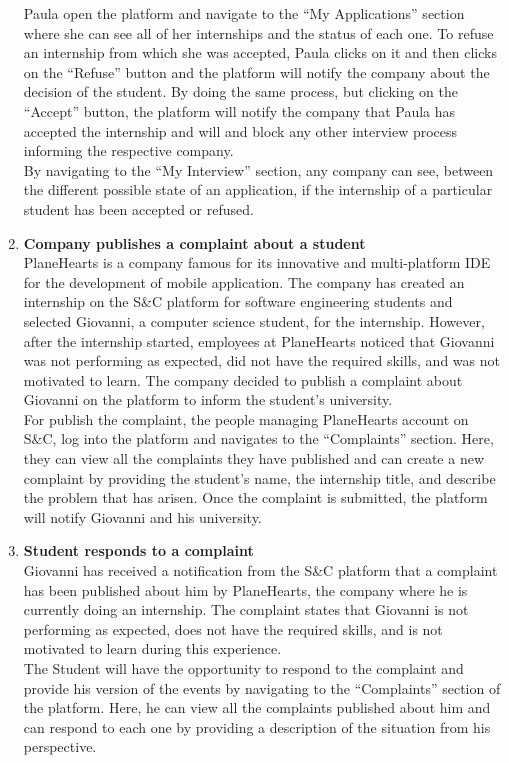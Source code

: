 \begin{enumerate}
    Paula open the platform and navigate to the “My Applications” section where she can see all of her internships and the status of each one. To refuse an internship from which she was accepted, Paula clicks on it and then clicks on the “Refuse” button and the platform will notify the company about the decision of the student. By doing the same process, but clicking on the “Accept” button, the platform will notify the company that Paula has accepted the internship and will and block any other interview process informing the respective company.\\ 
    By navigating to the “My Interview” section, any company can see, between the different possible state of an application, if the internship of a particular student has been accepted or refused.
    \item \textbf{\textcolor{titleColor}{Company publishes a complaint about a student}}\\
        PlaneHearts is a company famous for its innovative and multi-platform IDE for the development of mobile application. The company has created an internship on the S\&C platform for software engineering students and selected Giovanni, a computer science student, for the internship. However, after the internship started, employees at PlaneHearts noticed that Giovanni was not performing as expected, did not have the required skills, and was not motivated to learn. The company decided to publish a complaint about Giovanni on the platform to inform the student's university.\\
        For publish the complaint, the people managing PlaneHearts account on S\&C, log into the platform and navigates to the “Complaints” section. Here, they can view all the complaints they have published and can create a new complaint by providing the student's name, the internship title, and describe the problem that has arisen. Once the complaint is submitted, the platform will notify Giovanni and his university.
    \item \textbf{\textcolor{titleColor}{Student responds to a complaint}}\\
        Giovanni has received a notification from the S\&C platform that a complaint has been published about him by PlaneHearts, the company where he is currently doing an internship. The complaint states that Giovanni is not performing as expected, does not have the required skills, and is not motivated to learn during this experience.\\
        The Student will have the opportunity to respond to the complaint and provide his version of the events by navigating to the “Complaints” section of the platform. Here, he can view all the complaints published about him and can respond to each one by providing a description of the situation from his perspective.

\end{enumerate}
